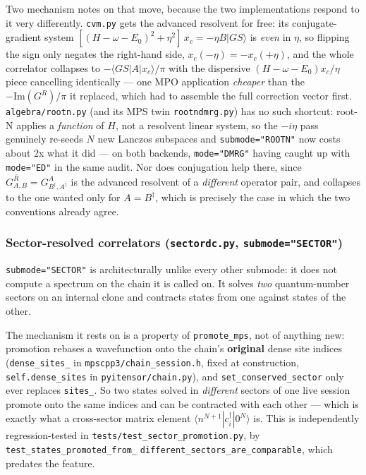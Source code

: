 \documentclass[11pt]{article}
\begin{document}
Two mechanism notes on that move, because the two implementations respond
to it very differently. \texttt{cvm.py} gets the advanced resolvent for
free: its conjugate-gradient system
$[(H-\omega-E_0)^2+\eta^2]\,x_c = -\eta B|GS\rangle$ is \emph{even} in
$\eta$, so flipping the sign only negates the right-hand side,
$x_c(-\eta) = -x_c(+\eta)$, and the whole correlator collapses to
$-\langle GS|A|x_c\rangle/\pi$ with the dispersive
$(H-\omega-E_0)x_c/\eta$ piece cancelling identically --- one MPO
application \emph{cheaper} than the $-\mathrm{Im}(G^R)/\pi$ it replaced,
which had to assemble the full correction vector first.
\texttt{algebra/rootn.py} (and its MPS twin \texttt{rootndmrg.py}) has no
such shortcut: root-N applies a \emph{function} of $H$, not a resolvent
linear system, so the $-i\eta$ pass genuinely re-seeds $N$ new Lanczos
subspaces and \texttt{submode="ROOTN"} now costs about 2x what it did ---
on both backends, \texttt{mode="DMRG"} having caught up with
\texttt{mode="ED"} in the same audit. Nor does conjugation help there,
since $\overline{G^R_{A,B}} = G^A_{B^\dagger,A^\dagger}$ is the advanced
resolvent of a \emph{different} operator pair, and collapses to the one
wanted only for $A = B^\dagger$, which is precisely the case in which the
two conventions already agree.

\subsubsection{Sector-resolved correlators (\texttt{sectordc.py},
\texttt{submode="SECTOR"})}

\texttt{submode="SECTOR"} is architecturally unlike every other submode:
it does not compute a spectrum on the chain it is called on. It solves
\emph{two} quantum-number sectors on an internal clone and contracts
states from one against states of the other.

The mechanism it rests on is a property of \texttt{promote\_mps}, not of
anything new: promotion rebases a wavefunction onto the chain's
\textbf{original} dense site indices (\texttt{dense\_sites\_} in
\texttt{mpscpp3/chain\_session.h}, fixed at construction,
\texttt{self.dense\_sites} in \texttt{pyitensor/chain.py}), and
\texttt{set\_conserved\_sector} only ever replaces \texttt{sites\_}. So
two states solved in \emph{different} sectors of one live session promote
onto the same indices and can be contracted with each other --- which is
exactly what a cross-sector matrix element
$\langle n^{N+1}|c^\dagger_i|0^N\rangle$ is. This is independently
regression-tested in \texttt{tests/test\_sector\_promotion.py}, by
\texttt{test\_states\_promoted\_from\_}\allowbreak
\texttt{different\_sectors\_are\_comparable}, which predates the
feature.
\end{document}
